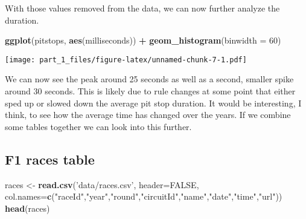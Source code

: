 \documentclass[]{article}
\newenvironment{Shaded}{\begin{snugshade}}{\end{snugshade}}
\newcommand{\KeywordTok}[1]{\textcolor[rgb]{0.13,0.29,0.53}{\textbf{#1}}}
\newcommand{\DataTypeTok}[1]{\textcolor[rgb]{0.13,0.29,0.53}{#1}}
\newcommand{\DecValTok}[1]{\textcolor[rgb]{0.00,0.00,0.81}{#1}}
\newcommand{\StringTok}[1]{\textcolor[rgb]{0.31,0.60,0.02}{#1}}
\newcommand{\OtherTok}[1]{\textcolor[rgb]{0.56,0.35,0.01}{#1}}
\newcommand{\OperatorTok}[1]{\textcolor[rgb]{0.81,0.36,0.00}{\textbf{#1}}}
\newcommand{\NormalTok}[1]{#1}
\begin{document}
\begin{Shaded}
\end{Shaded}

With those values removed from the data, we can now further analyze the
duration.

\begin{Shaded}
\begin{Highlighting}[]
\KeywordTok{ggplot}\NormalTok{(pitstops, }\KeywordTok{aes}\NormalTok{(milliseconds)) }\OperatorTok{+}\StringTok{ }\KeywordTok{geom_histogram}\NormalTok{(}\DataTypeTok{binwidth =} \DecValTok{60}\NormalTok{)}
\end{Highlighting}
\end{Shaded}

\texttt{[image: part\_1\_files/figure-latex/unnamed-chunk-7-1.pdf]}

We can now see the peak around 25 seconds as well as a second, smaller
spike around 30 seconds. This is likely due to rule changes at some
point that either sped up or slowed down the average pit stop duration.
It would be interesting, I think, to see how the average time has
changed over the years. If we combine some tables together we can look
into this further.

\subsection{F1 races table}\label{f1-races-table}

\begin{Shaded}
\begin{Highlighting}[]
\NormalTok{races <-}\StringTok{ }\KeywordTok{read.csv}\NormalTok{(}\StringTok{'data/races.csv'}\NormalTok{, }\DataTypeTok{header=}\OtherTok{FALSE}\NormalTok{, }\DataTypeTok{col.names=}\KeywordTok{c}\NormalTok{(}\StringTok{"raceId"}\NormalTok{,}\StringTok{"year"}\NormalTok{,}\StringTok{"round"}\NormalTok{,}\StringTok{"circuitId"}\NormalTok{,}\StringTok{"name"}\NormalTok{,}\StringTok{"date"}\NormalTok{,}\StringTok{"time"}\NormalTok{,}\StringTok{"url"}\NormalTok{))}
\KeywordTok{head}\NormalTok{(races)}
\end{Highlighting}
\end{Shaded}
\end{document}
